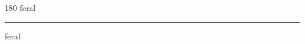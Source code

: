 
\begin{frame}
\begin{center}
\begin{turn}{180}
{\fontsize{2.5cm}{1em}\selectfont feral}
\end{turn}
\vspace{1em}\par  
\hrule
\vspace{1em}\par  
{\fontsize{2.5cm}{1em}\selectfont feral}
\end{center}
\end{frame}
